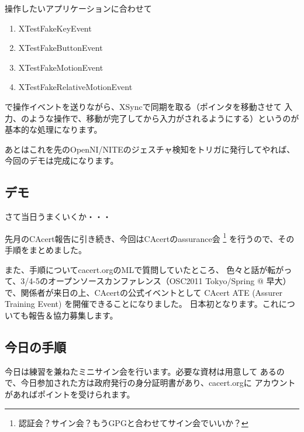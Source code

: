 \documentclass[mingoth,a4paper]{jsarticle}
\begin{document}
操作したいアプリケーションに合わせて
\begin{enumerate}
\item XTestFakeKeyEvent
\item XTestFakeButtonEvent
\item XTestFakeMotionEvent
\item XTestFakeRelativeMotionEvent
\end{enumerate}
で操作イベントを送りながら、XSyncで同期を取る（ポインタを移動させて
入力、のような操作で、移動が完了してから入力がされるようにする）というのが
基本的な処理になります。

あとはこれを先のOpenNI/NITEのジェスチャ検知をトリガに発行してやれば、
今回のデモは完成になります。

\subsection{デモ}
さて当日うまくいくか・・・


先月のCAcert報告に引き続き、今回はCAcertのassurance会
\footnote{認証会？サイン会？もうGPGと合わせてサイン会でいいか？}
を行うので、その手順をまとめました。

また、手順についてcacert.orgのMLで質問していたところ、
色々と話が転がって、3/4-5のオープンソースカンファレンス（OSC2011
Tokyo/Spring @ 早大）で、関係者が来日の上、CAcertの公式イベントとして
CAcert ATE (Assurer Training Event) を開催できることになりました。
日本初となります。これについても報告＆協力募集します。

\subsection{今日の手順}
今日は練習を兼ねたミニサイン会を行います。必要な資材は用意して
あるので、今日参加された方は政府発行の身分証明書があり、cacert.orgに
アカウントがあればポイントを受けられます。
\end{document}
